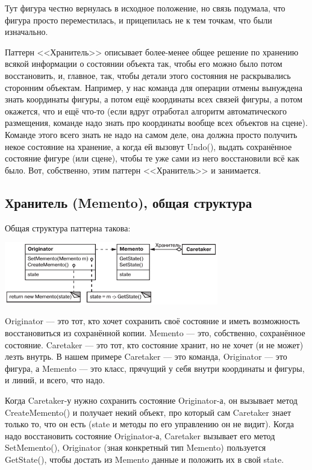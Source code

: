 \documentclass{../../text-style}
\begin{document}
Тут фигура честно вернулась в исходное положение, но связь подумала, что фигура просто переместилась, и прицепилась не к тем точкам, что были изначально.

Паттерн <<Хранитель>> описывает более-менее общее решение по хранению всякой информации о состоянии объекта так, чтобы его можно было потом восстановить, и, главное, так, чтобы детали этого состояния не раскрывались сторонним объектам. Например, у нас команда для операции отмены вынуждена знать координаты фигуры, а потом ещё координаты всех связей фигуры, а потом окажется, что и ещё что-то (если вдруг отработал алгоритм автоматического размещения, команде надо знать про координаты вообще всех объектов на сцене). Команде этого всего знать не надо на самом деле, она должна просто получить некое состояние на хранение, а когда ей вызовут Undo(), выдать сохранённое состояние фигуре (или сцене), чтобы те уже сами из него восстановили всё как было. Вот, собственно, этим паттерн <<Хранитель>> и занимается.

\subsection{Хранитель (Memento), общая структура}

Общая структура паттерна такова:

\begin{center}
    \includegraphics[width=0.7\textwidth]{memento.png}
\end{center}

Originator --- это тот, кто хочет сохранить своё состояние и иметь возможность восстановиться из сохранённой копии. Memento --- это, собственно, сохранённое состояние. Caretaker --- это тот, кто состояние хранит, но не хочет (и не может) лезть внутрь. В нашем примере Caretaker --- это команда, Originator --- это фигура, а Memento --- это класс, прячущий у себя внутри координаты и фигуры, и линий, и всего, что надо.

Когда Caretaker-у нужно сохранить состояние Originator-а, он вызывает метод CreateMemento() и получает некий объект, про который сам Caretaker знает только то, что он есть (state и методы по его управлению он не видит). Когда надо восстановить состояние Originator-а, Caretaker вызывает его метод SetMemento(), Originator (зная конкретный тип Memento) пользуется GetState(), чтобы достать из Memento данные и положить их в свой state.
\end{document}
